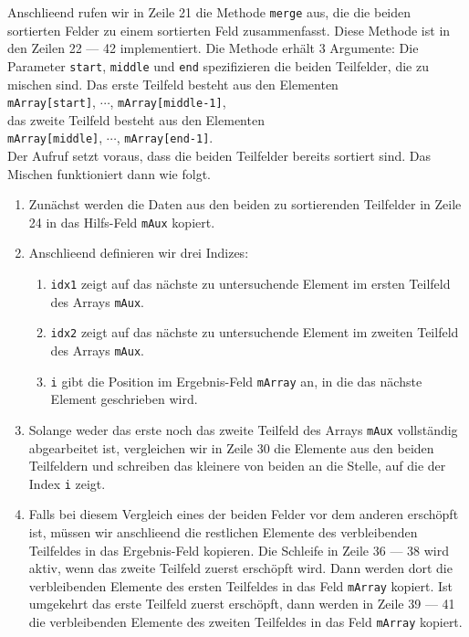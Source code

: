 Anschlie\3end rufen wir in Zeile 21 die Methode \texttt{merge} aus, die die beiden
sortierten Felder zu einem sortierten Feld zusammenfasst.  Diese Methode ist in den Zeilen
22 --- 42 implementiert.  Die Methode erh\"alt 3 Argumente: Die Parameter \texttt{start},
\texttt{middle} und \texttt{end} spezifizieren die beiden Teilfelder, die zu mischen sind.
Das erste Teilfeld besteht aus den Elementen \\[0.2cm]
\hspace*{1.3cm} \texttt{mArray[start]}, $\cdots$, \texttt{mArray[middle-1]}, \\[0.2cm]
das zweite Teilfeld besteht aus den Elementen \\[0.2cm]
\hspace*{1.3cm} \texttt{mArray[middle]}, $\cdots$, \texttt{mArray[end-1]}. \\[0.2cm]
Der Aufruf setzt voraus, dass die beiden Teilfelder bereits sortiert sind.
Das Mischen funktioniert dann wie folgt.
\begin{enumerate}
\item Zun\"achst werden die Daten aus den beiden zu sortierenden Teilfelder
      in Zeile 24 in das Hilfs-Feld \texttt{mAux} kopiert.
\item Anschlie\3end definieren wir drei Indizes:
      \begin{enumerate}
      \item \texttt{idx1} zeigt auf das n\"achste zu untersuchende Element im ersten
            Teilfeld des Arrays \texttt{mAux}.
      \item \texttt{idx2} zeigt auf das n\"achste zu untersuchende Element im zweiten
            Teilfeld des Arrays \texttt{mAux}.
      \item \texttt{i} gibt die Position im Ergebnis-Feld \texttt{mArray} an, in die das
            n\"achste Element geschrieben wird.
      \end{enumerate}
\item Solange weder das erste noch das zweite Teilfeld des Arrays \texttt{mAux}
      vollst\"andig abgearbeitet ist, vergleichen wir in Zeile 30 die Elemente aus den beiden Teilfeldern
      und schreiben das kleinere von beiden an die Stelle, auf die der Index \texttt{i} zeigt.
\item Falls bei diesem Vergleich eines der beiden Felder vor dem anderen ersch\"opft ist,
      m\"ussen wir anschlie\3end die restlichen Elemente des verbleibenden Teilfeldes
      in das Ergebnis-Feld kopieren.  Die Schleife in Zeile 36 --- 38 wird aktiv, wenn das
      zweite Teilfeld zuerst ersch\"opft wird.  Dann werden dort die verbleibenden Elemente
      des ersten Teilfeldes in das Feld \texttt{mArray} kopiert.  Ist umgekehrt das erste
      Teilfeld zuerst ersch\"opft, dann werden in Zeile 39 --- 41 die verbleibenden Elemente
      des zweiten Teilfeldes in das Feld \texttt{mArray} kopiert. 
\end{enumerate}


